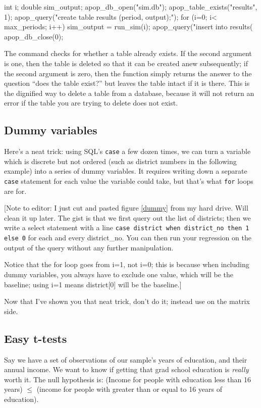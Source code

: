int     i;
double  sim_output;
apop_db_open("sim.db");
apop_table_exists("results", 1);
apop_query("create table results (period, output);");
for (i=0; i< max_periods; i++){
    sim_output = run_sim(i);
    apop_query("insert into results(%
    }
apop_db_close(0);

The  command checks for whether a table
already exists. If the second argument is one, then the table is deleted
so that it can be created anew subsequently; if the second argument is
zero, then the function simply returns the answer to the question ``does
the table exist?'' but leaves the table intact if it is there. This is
the dignified way to delete a table from a database, because it will not
return an error if the table you are trying to delete does not exist.

\subsection{Dummy variables}
Here's a neat trick: using SQL's {\tt case} a few dozen times, we can turn a
variable which is discrete but not ordered (such as district numbers in the
following example) into a series of dummy variables. It requires writing down a
separate {\tt case} statement for each value the variable could take, but that's
what {\tt for} loops are for.


[Note to editor: I just cut and pasted figure \ref{dummy} from my hard drive. Will clean it up
later. The gist is that we first query out the list of districts; then we write a
select statement with a line {\tt case district when district\_no then 1 else 0} for
each and every district\_no. You can then run your regression on the output of the
query without any further manipulation.

Notice that the for loop goes from i=1, not i=0; this is because when including
dummy variables, you always have to exclude one value, which will be the baseline;
using i=1 means district[0] will be the baseline.]

Now that I've shown you that neat trick, don't do it; instead use
 on the matrix side.

\subsection{Easy t-tests}
Say we have a set of observations of our sample's years of education, and their annual income. We want to
know if getting that grad school education is {\it really} worth it. The null hypothesis is: (Income for
people with education less than 16 years) $\leq$ (income for people with greater than or equal to 16 years
of education).

